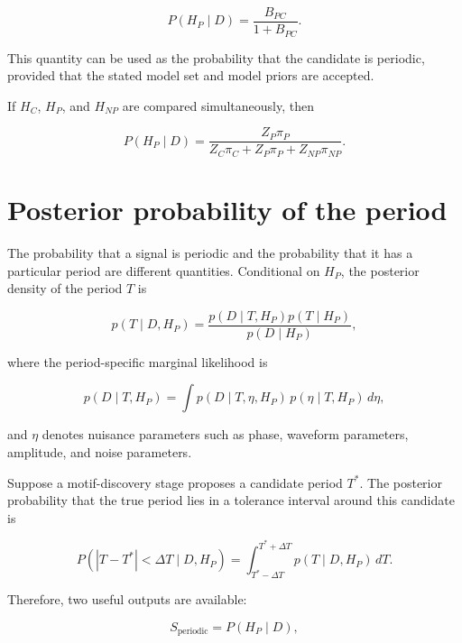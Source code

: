 \documentclass[a4paper]{article}
\begin{document}
\begin{equation}
P(H_P\mid D)
=
\frac{B_{PC}}{1+B_{PC}}.
\end{equation}

This quantity can be used as the probability that the candidate is periodic, provided that the stated model set and model priors are accepted.

If $H_C$, $H_P$, and $H_{NP}$ are compared simultaneously, then

\begin{equation}
P(H_P\mid D)
=
\frac{Z_P\pi_P}
{Z_C\pi_C+Z_P\pi_P+Z_{NP}\pi_{NP}}.
\end{equation}

\section{Posterior probability of the period}

The probability that a signal is periodic and the probability that it has a particular period are different quantities. Conditional on $H_P$, the posterior density of the period $T$ is

\begin{equation}
p(T\mid D,H_P)
=
\frac{p(D\mid T,H_P)p(T\mid H_P)}
{p(D\mid H_P)},
\end{equation}

where the period-specific marginal likelihood is

\begin{equation}
p(D\mid T,H_P)
=
\int
p(D\mid T,\eta,H_P)
\,p(\eta\mid T,H_P)
\,d\eta,
\end{equation}

and $\eta$ denotes nuisance parameters such as phase, waveform parameters, amplitude, and noise parameters.

Suppose a motif-discovery stage proposes a candidate period $T^{\ast}$. The posterior probability that the true period lies in a tolerance interval around this candidate is

\begin{equation}
P\left(\left|T-T^{\ast}\right|<\Delta T\mid D,H_P\right)
=
\int_{T^{\ast}-\Delta T}^{T^{\ast}+\Delta T}
p(T\mid D,H_P)\,dT.
\end{equation}

Therefore, two useful outputs are available:

\begin{equation}
S_{\mathrm{periodic}}
=
P(H_P\mid D),
\end{equation}
\end{document}
